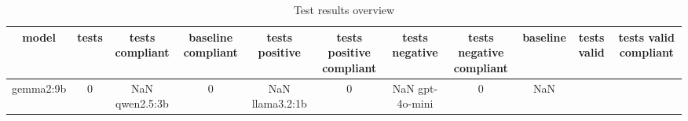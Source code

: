 
  \begin{table}[h!]
  \centering
  \begin{tabular}{|c|c|c|c|c|c|c|c|c|c|c|}
  \hline
  model & tests & tests compliant & baseline compliant & tests positive & tests positive compliant & tests negative & tests negative compliant & baseline & tests valid & tests valid compliant \\
  \hline
  gemma2:9b & 0 & NaN%
\hline
qwen2.5:3b & 0 & NaN%
\hline
llama3.2:1b & 0 & NaN%
\hline
gpt-4o-mini & 0 & NaN%
  \end{tabular}
  \caption{Test results overview}
  
  \end{table}
  